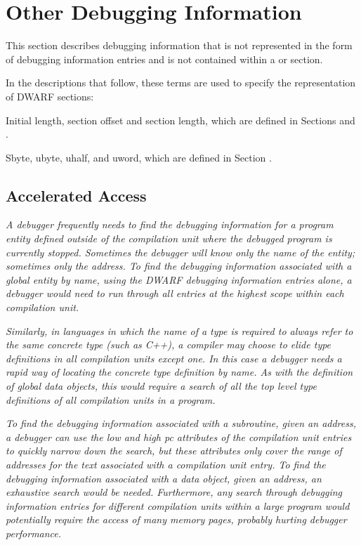 \chapter{Other Debugging Information}
\label{chap:otherdebugginginformation}
This section describes debugging information that is not
represented in the form of debugging information entries and
is not contained within a  or 
 section.

In the descriptions that follow, these terms are used to
specify the representation of DWARF sections:

Initial length, section offset and section length, which are
defined in 
Sections  and 
.

Sbyte, ubyte, uhalf, and uword, which are defined in 
Section .

\section{Accelerated Access}
\label{chap:acceleratedaccess}

\textit{A debugger frequently needs to find the debugging information
for a program entity defined outside of the compilation unit
where the debugged program is currently stopped. Sometimes the
debugger will know only the name of the entity; sometimes only
the address. To find the debugging information associated with
a global entity by name, using the DWARF debugging information
entries alone, a debugger would need to run through all
entries at the highest scope within each compilation unit.}

\textit{Similarly, in languages in which the name of a type is
required to always refer to the same concrete type (such as
C++), a compiler may choose to elide type definitions in
all compilation units except one. In this case a debugger
needs a rapid way of locating the concrete type definition
by name. As with the definition of global data objects, this
would require a search of all the top level type definitions
of all compilation units in a program.}

\textit{To find the debugging information associated with a subroutine,
given an address, a debugger can use the low and high pc
attributes of the compilation unit entries to quickly narrow
down the search, but these attributes only cover the range
of addresses for the text associated with a compilation unit
entry. To find the debugging information associated with a
data object, given an address, an exhaustive search would be
needed. Furthermore, any search through debugging information
entries for different compilation units within a large program
would potentially require the access of many memory pages,
probably hurting debugger performance.}

